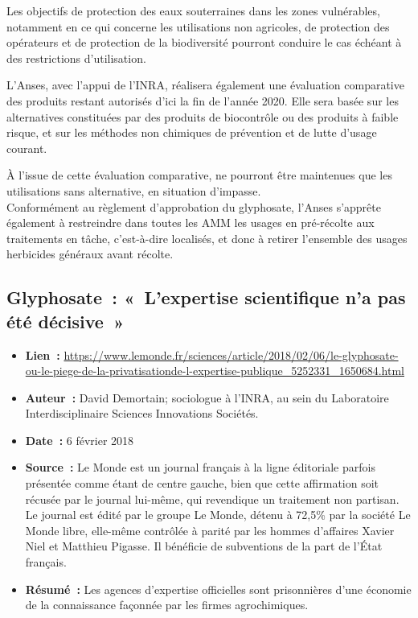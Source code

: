 \documentclass[8pt]{article}
\begin{document}
Les objectifs de protection des eaux souterraines dans les zones vulnérables, notamment en ce qui concerne les utilisations non agricoles, de protection des opérateurs et de protection de la biodiversité pourront conduire le cas échéant à des restrictions d'utilisation.

L'Anses, avec l'appui de l'INRA, réalisera également une évaluation comparative des produits restant autorisés d'ici la fin de l'année 2020. Elle sera basée sur les alternatives constituées par des produits de biocontrôle ou des produits à faible risque, et sur les méthodes non chimiques de prévention et de lutte d’usage courant.

À l'issue de cette évaluation comparative, ne pourront être maintenues que les utilisations sans alternative, en situation d’impasse.\\

Conformément au règlement d'approbation du glyphosate, l'Anses s'apprête également à restreindre dans toutes les AMM les usages en pré-récolte aux traitements en tâche, c'est-à-dire localisés, et donc à retirer l’ensemble des usages herbicides généraux avant récolte.

\newpage
\subsection{Glyphosate~: «~L’expertise scientifique n’a pas été décisive~»}
\label{sec:expertise}

\begin{itemize}
	\item \textbf{Lien~: }  \url{https://www.lemonde.fr/sciences/article/2018/02/06/le-glyphosate-ou-le-piege-de-la-privatisationde-l-expertise-publique_5252331_1650684.html} 
	\item \textbf{Auteur~: }  David Demortain; sociologue à l’INRA, au sein du Laboratoire Interdisciplinaire Sciences Innovations Sociétés.
	\item \textbf{Date~: } 6 février 2018
	\item \textbf{Source~: } Le Monde est un journal  français à la ligne éditoriale parfois présentée comme étant de centre gauche, bien que cette affirmation soit récusée par le journal lui-même, qui revendique un traitement non partisan. Le journal est édité par le groupe Le Monde, détenu à 72,5\% par la société Le Monde libre, elle-même contrôlée à parité par les hommes d'affaires Xavier Niel et Matthieu Pigasse. Il bénéficie de subventions de la part de l'État français. 
	\item \textbf{Résumé~: } Les agences d’expertise officielles sont prisonnières d’une économie de la connaissance façonnée par les firmes agrochimiques.
\end{itemize}
\end{document}
